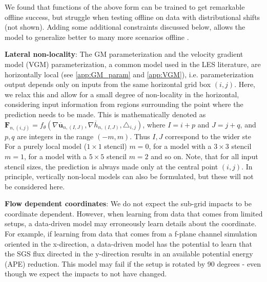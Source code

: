 \documentclass[draft]{agujournal2019}
\begin{document}
We found that functions of the above form can be trained to get remarkable offline success, but struggle when testing offline on data with distributional shifts (not shown). Adding some additional constraints discussed below, allows the model to generalize better to many more scenarios offline \cite{beucler2021climate}.

\textbf{Lateral non-locality}:
The GM parameterization and the velocity gradient model (VGM) parameterization, a common model used in the LES literature, are horizontally local (see \ref{app:GM_param} and \ref{app:VGM}), i.e. parameterization output depends only on inputs from the same horizontal grid box $(i,j)$. 
Here, we relax this and allow for a small degree of non-locality in the horizontal, considering input information from regions surrounding the point where the prediction needs to be made. 
This is mathematically denoted as 
$\mathbf{F}_{n,(i,j)} = f_{\theta}(\nabla \overline{\mathbf{u}}_{n,(I,J)}, \nabla \overline{h}_{n,(I,J)}, \triangle_{i,j})$, 
where $I=i+p$ and  $J=j+ q$, and $p,q$ are integers in the range $(-m,m)$. Thus $I,J$ correspond to the wider ste
For a purely local model ($1\times1$ stencil) $m=0$, for a model with a $3\times3$ stencil $m=1$, for a model with a $5\times5$ stencil $m=2$ and so on. Note, that for all input stencil sizes, the prediction is always made only at the central point $(i,j)$. 
In principle, vertically non-local models can also be formulated, but these will not be considered here.

\textbf{Flow dependent coordinates}:
We do not expect the sub-grid impacts to be coordinate dependent. However, when learning from data that comes from limited setups, a data-driven model may erroneously learn details about the coordinate. For example, if learning from data that comes from a f-plane channel simulation oriented in the x-direction, a data-driven model has the potential to learn that the SGS flux directed in the y-direction results in an available potential energy (APE) reduction. This model may fail if the setup is rotated by 90 degrees - even though we expect the impacts to not have changed. 
\end{document}
